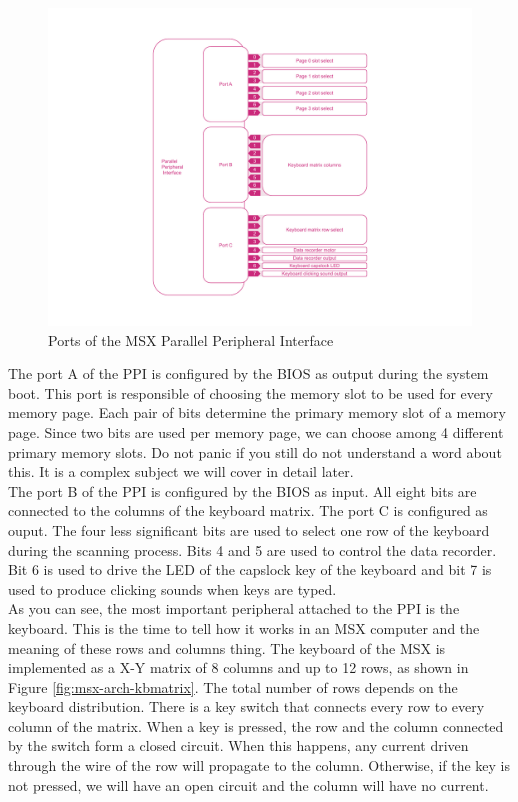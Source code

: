 \begin{figure}
	\centering
	\includegraphics[width=1\linewidth,trim={0cm 50 0 50}]{images/figures/msx-arch-ppi-ports}
	\caption{Ports of the MSX Parallel Peripheral Interface}
	\label{fig:msx-arch-ppi-ports}
\end{figure}

The port A of the PPI is configured by the BIOS as output during the system boot. This port is responsible of choosing the memory slot to be used for every memory page. Each pair of bits determine the primary memory slot of a memory page. Since two bits are used per memory page, we can choose among 4 different primary memory slots. Do not panic if you still do not understand a word about this. It is a complex subject we will cover in detail later. \\

The port B of the PPI is configured by the BIOS as input. All eight bits are connected to the columns of the keyboard matrix. The port C is configured as ouput. The four less significant bits are used to select one row of the keyboard during the scanning process. Bits 4 and 5 are used to control the data recorder. Bit 6 is used to drive the LED of the capslock key of the keyboard and bit 7 is used to produce clicking sounds when keys are typed. \\

As you can see, the most important peripheral attached to the PPI is the keyboard. This is the time to tell how it works in an MSX computer and the meaning of these rows and columns thing. The keyboard of the MSX is implemented as a X-Y matrix of 8 columns and up to 12 rows, as shown in Figure \ref{fig:msx-arch-kbmatrix}. The total number of rows depends on the keyboard distribution. There is a key switch that connects every row to every column of the matrix. When a key is pressed, the row and the column connected by the switch form a closed circuit. When this happens, any current driven through the wire of the row will propagate to the column. Otherwise, if the key is not pressed, we will have an open circuit and the column will have no current. \\


